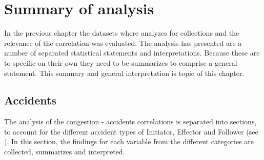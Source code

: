 \chapter{Summary of analysis}
\label{analysis_summary}
In the previous chapter the datasets where analyzes for collections and the relevance of the correlation was evaluated. The analysis has presented are a number of separated statistical statements and interpretations. Because these are to specific on their own they need to be summarizes to comprise a general statement. This summary and general interpretation is topic of this chapter.

\section{Accidents}
The analysis of the congestion -  accidents correlations is separated into sections, to account for the different accident types of Initiator, Effector and Follower (see \label{methodology_data_processing}). In this section, the findings for each variable from the different categories are collected, summarizes and interpreted. 

